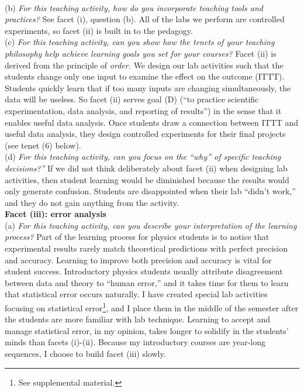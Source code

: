 \documentclass[../../../main.tex]{subfiles}
\begin{document}
\\
\vspace{0.15cm}
(b) \textit{For this teaching activity, how do you incorporate teaching tools and practices?}  See facet (i), question (b).  All of the labs we perform are controlled experiments, so facet (ii) is built in to the pedagogy.
\\
\vspace{0.15cm}
(c) \textit{For this teaching activity, can you show how the tenets of your teaching philosophy help achieve learning goals you set for your courses?}  Facet (ii) is derived from the principle of \textit{order.}  We design our lab activities such that the students change only one input to examine the effect on the outcome (ITTT).  Students quickly learn that if too many inputs are changing simultaneously, the data will be useless.  So facet (ii) serves goal (D) (``to practice scientific experimentation, data analysis, and reporting of results'') in the sense that it enables useful data analysis.  Once students draw a connection between ITTT and useful data analysis, they design controlled experiments for their final projects (see tenet (6) below).
\\
\vspace{0.15cm}
(d) \textit{For this teaching activity, can you focus on the ``why'' of specific teaching decisions?''}  If we did not think deliberately about facet (ii) when designing lab activities, then student learning would be diminished because the results would only generate confusion.  Students are disappointed when their lab ``didn't work,'' and they do not gain anything from the activity.
\\
\vspace{0.15cm}
\textbf{Facet (iii): error analysis}
\\
\vspace{0.15cm}
(a) \textit{For this teaching activity, can you describe your interpretation of the learning process?}  Part of the learning process for physics students is to notice that experimental results rarely match theoretical predictions with perfect precision and accuracy.  Learning to improve both precision and accuracy is vital for student success.  Introductory physics students usually attribute disagreement between data and theory to ``human error,'' and it takes time for them to learn that statistical error occurs naturally.  I have created special lab activities focusing on statistical error\footnote{See supplemental material.}, and I place them in the middle of the semester after the students are more familiar with lab technique.  Learning to accept and manage statistical error, in my opinion, takes longer to solidify in the students' minds than facets (i)-(ii).  Because my introductory courses are year-long sequences, I choose to build facet (iii) slowly.
\end{document}

